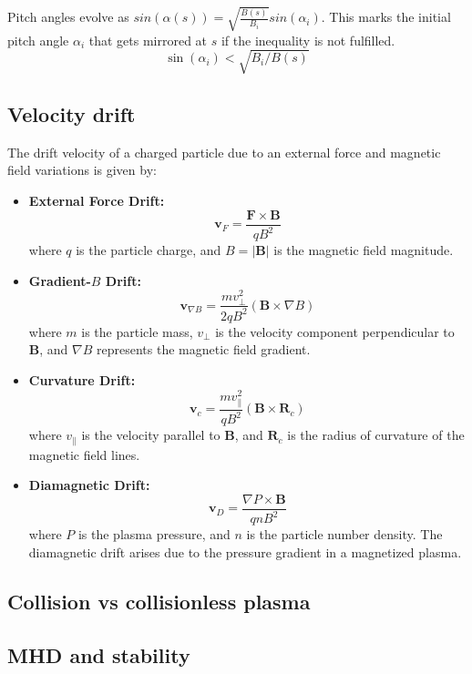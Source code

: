 \documentclass[smallextended]{svjour3}
\begin{document}
Pitch angles evolve as $sin(\alpha(s)) = \sqrt{\frac{B(s)}{B_i}}sin(\alpha_i)$. This marks the initial pitch angle $\alpha_i$ that gets mirrored at $s$ if the inequality is not fulfilled. 
\begin{equation}
    \sin(\alpha_i) < \sqrt{B_i / B(s)}
\end{equation}

\subsection{Velocity drift}

The drift velocity of a charged particle due to an external force and magnetic field variations is given by:

\begin{itemize}
    \item \textbf{External Force Drift:}
    \[
    \mathbf{v}_F = \frac{\mathbf{F} \times \mathbf{B}}{q B^2}
    \]
    where \( q \) is the particle charge, and \( B = |\mathbf{B}| \) is the magnetic field magnitude.

    \item \textbf{Gradient-\( B \) Drift:}
    \[
    \mathbf{v}_{\nabla B} = \frac{m v_\perp^2}{2 q B^2} (\mathbf{B} \times \nabla B)
    \]
    where \( m \) is the particle mass, \( v_\perp \) is the velocity component perpendicular to \( \mathbf{B} \), and \( \nabla B \) represents the magnetic field gradient.

    \item \textbf{Curvature Drift:}
    \[
    \mathbf{v}_c = \frac{m v_\parallel^2}{q B^2} (\mathbf{B} \times \mathbf{R}_c)
    \]
    where \( v_\parallel \) is the velocity parallel to \( \mathbf{B} \), and \( \mathbf{R}_c \) is the radius of curvature of the magnetic field lines.

     \item \textbf{Diamagnetic Drift:}
    \[
    \mathbf{v}_D = \frac{\nabla P \times \mathbf{B}}{q n B^2}
    \]
    where \( P \) is the plasma pressure, and \( n \) is the particle number density. The diamagnetic drift arises due to the pressure gradient in a magnetized plasma.

\end{itemize}
\subsection{Collision vs collisionless plasma}
\subsection{MHD and stability}
\end{document}
